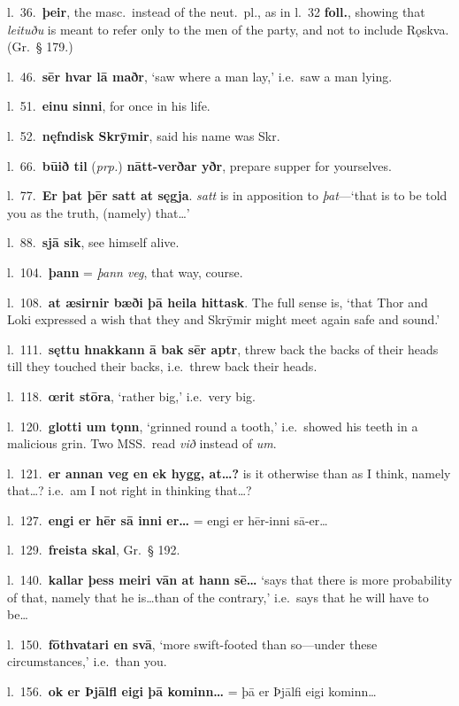 \documentclass[12pt,letterpaper]{book}
\begin{document}
l.\ 36.\ \textbf{þeir}, the masc.\ instead of the neut.\ pl., as in l.\ 32
\textbf{foll.}, showing that \textit{leituðu} is meant to refer only to
the men of the party, and not to include Rǫskva.  (Gr.\ § 179.)

l.\ 46.\ \textbf{sēr hvar lā maðr}, `saw where a man lay,' i.e.\ saw a man
lying.

l.\ 51.\ \textbf{einu sinni}, for once in his life.

l.\ 52.\ \textbf{nęfndisk Skrȳmir}, said his name was Skr.

l.\ 66.\ \textbf{būið til} (\textit{prp.}) \textbf{nātt-verðar yðr}, prepare supper for
yourselves.

l.\ 77.\ \textbf{Er þat þēr satt at sęgja}.  \textit{satt} is in apposition to
\textit{þat}---`that is to be told you as the truth, (namely) that\ldots'

l.\ 88.\ \textbf{sjā sik}, see himself alive.

l.\ 104.\ \textbf{þann} = \textit{þann veg}, that way, course.

l.\ 108.\ \textbf{at æsirnir bæði þā heila hittask}.  The full sense is,
`that Thor and Loki expressed a wish that they and Skrȳmir might
meet again safe and sound.'

l.\ 111.\ \textbf{sęttu hnakkann ā bak sēr aptr}, threw back the
backs of their heads till they touched their backs, i.e.\ threw
back their heads.

l.\ 118.\ \textbf{œrit stōra}, `rather big,' i.e.\ very big.

l.\ 120.\ \textbf{glotti um tǫnn}, `grinned round a tooth,' i.e.\ showed
his teeth in a malicious grin.  Two MSS.\ read \textit{við} instead of
\textit{um}.

l.\ 121.\ \textbf{er annan veg en ek hygg, at\ldots?}  is it otherwise than
as I think, namely that\ldots?  i.e.\ am I not right in thinking
that\ldots?

l.\ 127.\ \textbf{engi er hēr sā inni er\ldots} = engi er hēr-inni sā-er\ldots

l.\ 129.\ \textbf{freista skal}, Gr.\ § 192.

l.\ 140.\ \textbf{kallar þess meiri vān at hann sē\ldots}  `says that there
is more probability of that, namely that he is\ldots than of the
contrary,' i.e.\ says that he will have to be\ldots

l.\ 150.\ \textbf{fōthvatari en svā}, `more swift-footed than so---under
these circumstances,' i.e.\ than you.

l.\ 156.\ \textbf{ok er Þjālfl eigi þā kominn\ldots} = þā er Þjālfi eigi
kominn\ldots
\end{document}
